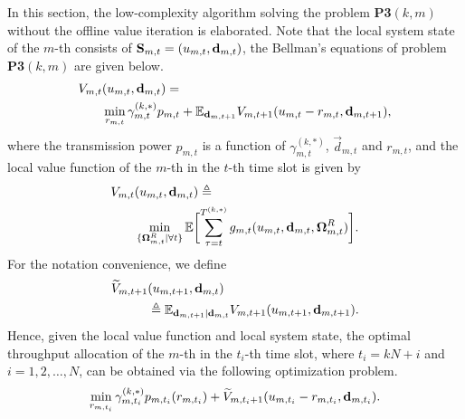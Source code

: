 In this section, the low-complexity algorithm solving the problem \textbf{P3$(k,m)$} without the offline value iteration is elaborated. Note that the local system state of the $m$-th {\IAV} consists of $\mathbf{S}_{m,t} =  ( u_{m,t}, \mathbf{d}_{m,t} )$, the Bellman's equations of problem \textbf{P3$(k,m)$} are given below.
\begin{align*}
    V_{m,t} & (  u_{m,t}, \mathbf{d}_{m,t} )= \nonumber\\
    & \min_{ r_{m,t} } \gamma^{(k,*)}_{m,t} p_{m,t} + \mathbb{E}_{ \mathbf{d}_{m,t+1} } V_{m,t+1}(  u_{m,t}-r_{m,t}, \mathbf{d}_{m,t+1} ),
\end{align*}
where the transmission power $p_{m,t}$ is a function of $\gamma^{(k,*)}_{m,t}$, $\vec{d}_{m,t}$ and $r_{m,t}$, and the local value function of the $m$-th {\IAV} in the $t$-th time slot is given by
\begin{align}
    V_{m,t} & (u_{m,t}, \vec{d}_{m,t}) \define 
    \nonumber\\
    &\min_{ \{\Policy^{R}_{m,t}|\forall t\} } \mathbb{E} \Bracket{ \sum_{\tau=t}^{T^{(k,*)}} g_{m,t}(u_{m,t}, \vec{d}_{m,t}, \Policy^{R}_{m,t}) }.
\end{align}
For the notation convenience, we define
\begin{align}
    \widetilde{V}_{m,t+1}&(u_{m,t+1}, \mathbf{d}_{m,t})
    \nonumber\\
    &\triangleq \mathbb{E}_{ \mathbf{d}_{m,t+1} | \mathbf{d}_{m,t} } V_{m,t+1}(  u_{m,t+1}, \mathbf{d}_{m,t+1} ).
 \label{eqn:local_valfn_alt}
\end{align}
Hence, given the local value function and local system state, the optimal throughput allocation of the $m$-th {\IAV} in the $t_i$-th time slot, where  $t_i = kN + i$ and $i=1,2,\dots,N$, can be obtained via the following optimization problem.
\begin{align}
    \min_{ r_{m,t_i} } \gamma^{(k,*)}_{m,t_i} p_{m,t_i} (r_{m,t_i})+ \widetilde{V}_{m,t_i+1}(u_{m,t_i}-r_{m,t_i}, \mathbf{d}_{m,t_i}).
    \label{eqn:local_valfn}
\end{align}

